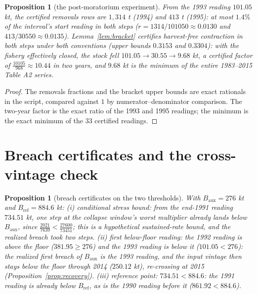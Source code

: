\documentclass[10pt,twocolumn]{article}
\theoremstyle{plain}
\newtheorem{proposition}[theorem]{Proposition}
\theoremstyle{remark}
\begin{document}
\begin{proposition}[the post-moratorium experiment]
\label{prop:experiment}
From the 1993 reading \(101.05\) kt, the certified removals rows are
\(1{,}314\) t (1994) and \(413\) t (1995): at most \(1.4\%\) of the
interval's start reading in both steps (\(r = 1314/101050 \approx
0.0130\) and \(413/30550 \approx 0.0135\)). Lemma~\ref{lem:bracket}
certifies harvest-free contraction in both steps under both conventions
(upper bounds \(0.3153\) and \(0.3304\)): with the fishery effectively
closed, the stock fell \(101.05 \to 30.55 \to 9.68\) kt, a certified
factor of \(\tfrac{10105}{968} \approx 10.44\) in two years, and
\(9.68\) kt is the minimum of the entire 1983--2015 Table A2 series.
\end{proposition}

\begin{proof}
The removals fractions and the bracket upper bounds are exact
rationals in the script, compared against \(1\) by
numerator--denominator comparison. The two-year factor is the exact
ratio of the 1993 and 1995 readings; the minimum is the exact minimum
of the 33 certified readings.
\end{proof}

\section{Breach certificates and the cross-vintage check}\label{breach}

\begin{proposition}[breach certificates on the two thresholds]
\label{prop:breach}
With \(B_{\mathrm{aux}} = 276\) kt and \(B_{\mathrm{ref}} = 884.6\)
kt: (i) \emph{conditional stress bound}: from the end-1991 reading
\(734.51\) kt, one step at the collapse window's worst multiplier
already lands below \(B_{\mathrm{aux}}\), since
\(\tfrac{2021}{7639} < \tfrac{27600}{73451}\); this is a hypothetical
sustained-rate bound, and the realized breach took two steps.
(ii) \emph{first below-floor reading}: the 1992 reading is above the
floor (\(381.95 \ge 276\)) and the 1993 reading is below it
(\(101.05 < 276\)): the realized first breach of \(B_{\mathrm{aux}}\)
is the 1993 reading, and the input vintage then stays below the floor
through 2014 (\(250.12\) kt), re-crossing at 2015
(Proposition~\ref{prop:recovery}). (iii) \emph{reference point}:
\(734.51 < 884.6\): the 1991 reading is already below
\(B_{\mathrm{ref}}\), as is the 1990 reading before it
(\(861.92 < 884.6\)).
\end{proposition}
\end{document}
